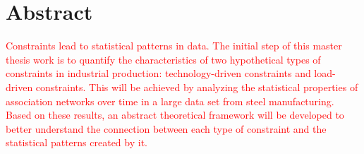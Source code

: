 \chapter*{Abstract}

\textcolor{red}{Constraints lead to statistical patterns in data. The initial step of this master thesis work is to quantify the characteristics of two hypothetical types of constraints in industrial production: technology-driven constraints and load-driven constraints. This will be achieved by analyzing the statistical properties of association networks over time in a large data set from steel manufacturing. Based on these results, an abstract theoretical framework will be developed to better understand the connection between each type of constraint and the statistical patterns created by it.}
